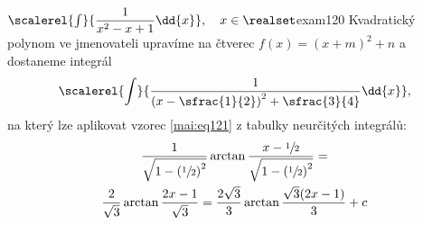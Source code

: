 \begin{mathexam}{\(\scalerel{\int}{\dfrac{1}{x^2 - x + 1}\dd{x}},\quad x\in\realset\)}{exam120}
  Kvadratický polynom ve jmenovateli upravíme na čtverec \(f(x) = (x + m)^2 + n\) a dostaneme
  integrál\[\scalerel{\int}{\dfrac{1}{\left(x-\sfrac{1}{2}\right)^2+\sfrac{3}{4}}\dd{x}},\] na který
  lze aplikovat vzorec \ref{mai:eq121} z tabulky neurčitých integrálů: 
  \begin{multline*}
    \dfrac{1}{\sqrt{1-\left(\sfrac{1}{2}\right)^2}}\arctan
    \dfrac{x-\sfrac{1}{2}}{\sqrt{1-\left(\sfrac{1}{2}\right)^2}} = \\
    \dfrac{2}{\sqrt{3}}\arctan\dfrac{2x-1}{\sqrt{3}}  =
    \dfrac{2\sqrt{3}}{3}\arctan\dfrac{\sqrt{3}(2x-1)}{3} + c
  \end{multline*}
\end{mathexam}